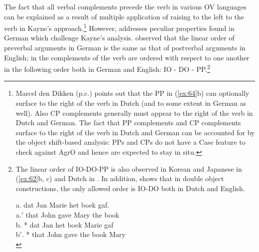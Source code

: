 The fact that all verbal complements precede the verb in various \ac{OV} languages can be explained as a result of multiple application of raising to the left to the verb in Kayne’s approach.\footnote{Marcel den Dikken (p.c.) points out that the \ac{PP} in (\ref{ex:64}b) can optionally surface to the right of the verb in Dutch (and to some extent in German as well). Also \ac{CP} complements generally must appear to the right of the verb in Dutch and German. The fact that \ac{PP} complements and \ac{CP} complements surface to the right of the verb in Dutch and German can be accounted for by the object shift-based analysis: \ac{PP}s and \acp{CP} do not have a Case feature to check against AgrO and hence are expected to stay in situ.} However, \citet{Haider1992,Haider2000} addresses peculiar properties found in German which challenge Kayne’s analysis. \citet{Haider1992} observed that the linear order of preverbal arguments in German is the same as that of postverbal arguments in English; in  the complements of the verb are ordered with respect to one another in the following order both in German and English: \acf{IO} - \acf{DO} - \acf{PP}.\footnote{The linear order of \ac{IO}-\ac{DO}-\ac{PP} is also observed in Korean and Japanese in (\ref{ex:62}b, c) and Dutch in . In addition, \citet[183]{Barbiers2000} shows that in double object constructions, the only allowed order is \ac{IO}-\ac{DO} both in Dutch and English. 

\ea
\gllll  a.  {} dat  Jan  {\longrule}  Marie  het boek  gaf. \\
        a.$'$ {} that  John  gave  Mary  the book    {\longrule}  \\
        b.  * dat  Jan  {\longrule}  het boek    Marie  gaf \\
        b$'$. * that  John  gave  the book   Mary \\
\zlast
}

